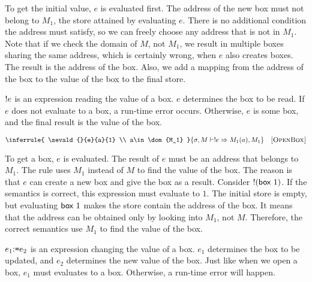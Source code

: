 To get the initial value, $e$ is evaluated first. The address of the new
box must not belong to $M_1$, the store attained by evaluating $e$.
There is no additional condition the address must satisfy, so we can freely
choose any address that is not in $M_1$.
Note that if we check the domain of $M$, not $M_1$, we result in multiple
boxes sharing the same address, which is certainly wrong, when $e$ also creates
boxes.
The result is the address of the box. Also, we add a mapping from the address of
the box to the value of the box to the final store.

$!e$ is an expression reading the value of a box. $e$ determines the box
to be read. If $e$ does not evaluate to a box, a run-time error occurs.
Otherwise, $e$ is some box, and the final result is the value of the box.


\vspace{-1em}

\[
  \inferrule
  {
    \sevald{}{e}{a}{1} \\
    a\in \dom{M_1}
  }
  { \seval{\sigma}{M}{\ederef{e}}{M_1(a)}{M_1} }
  \quad\textsc{[OpenBox]}
\]

To get a box, $e$ is evaluated. The result of $e$ must be an address that
belongs to $M_1$. The rule uses $M_1$ instead
of $M$ to find the value of the box. The reason is that $e$ can create a new
box and give the box as a result. Consider $!(\textsf{box}\ 1)$. If the semantics
is correct, this expression must evaluate to $1$. The initial
store is empty, but evaluating $\textsf{box}\ 1$ makes the store contain the address of
the box. It means that the address can be obtained only by looking into $M_1$,
not $M$. Therefore, the correct semantics use $M_1$ to find the value of the
box.

$e_1{:}\texttt{=} e_2$ is an expression changing the value of a box. $e_1$ determines the box
to be updated, and $e_2$ determines the new value of the box. Just like when we
open a box, $e_1$ must evaluates to a box. Otherwise, a run-time error will happen.

